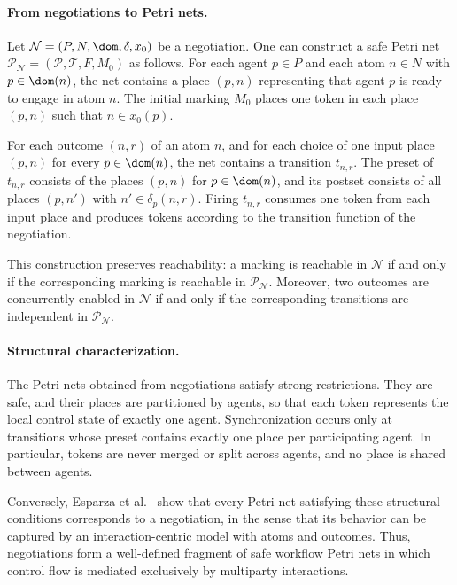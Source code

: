 \paragraph{From negotiations to Petri nets.}
Let $\mathcal{N}=(P,N,\dom,\delta,x_0)$ be a negotiation. One can construct a safe
Petri net $\mathcal{P}_{\mathcal{N}}=(\mathcal{P},\mathcal{T},F,M_0)$ as follows.
For each agent $p\in P$ and each atom $n\in N$ with $p\in\dom(n)$, the net contains a
place $(p,n)$ representing that agent $p$ is ready to engage in atom $n$. The initial
marking $M_0$ places one token in each place $(p,n)$ such that $n\in x_0(p)$.

For each outcome $(n,r)$ of an atom $n$, and for each choice of one input place
$(p,n)$ for every $p\in\dom(n)$, the net contains a transition $t_{n,r}$. The preset
of $t_{n,r}$ consists of the places $(p,n)$ for $p\in\dom(n)$, and its postset
consists of all places $(p,n')$ with $n'\in\delta_p(n,r)$. Firing $t_{n,r}$ consumes
one token from each input place and produces tokens according to the transition
function of the negotiation.

This construction preserves reachability: a marking is reachable in
$\mathcal{N}$ if and only if the corresponding marking is reachable in
$\mathcal{P}_{\mathcal{N}}$. Moreover, two outcomes are concurrently enabled in
$\mathcal{N}$ if and only if the corresponding transitions are independent in
$\mathcal{P}_{\mathcal{N}}$.

\paragraph{Structural characterization.}
The Petri nets obtained from negotiations satisfy strong restrictions. They are
safe, and their places are partitioned by agents, so that each token represents the
local control state of exactly one agent. Synchronization occurs only at transitions
whose preset contains exactly one place per participating agent. In particular,
tokens are never merged or split across agents, and no place is shared between
agents.

Conversely, Esparza et al.~\cite{esparza-neg-ceur} show that every Petri net satisfying
these structural conditions corresponds to a negotiation, in the sense that its
behavior can be captured by an interaction-centric model with atoms and outcomes.
Thus, negotiations form a well-defined fragment of safe workflow Petri nets in which
control flow is mediated exclusively by multiparty interactions.

